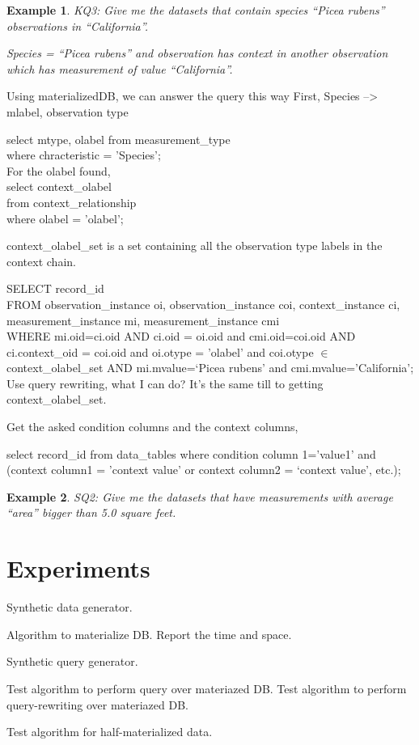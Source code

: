 \documentclass[10pt]{article}
\newtheorem{example}{Example}[section]
\begin{document}
\begin{example}
KQ3: Give me the datasets that contain species ``Picea rubens''
  observations in ``California''. 

Species = ``Picea rubens'' and observation has context {\em in}
another observation which has measurement of value ``California''. 
\end{example}

Using materializedDB, we can answer the query this way
First, Species --> mlabel, observation type 

select mtype, olabel from measurement\_type  \\
where chracteristic = 'Species';  \\

For the olabel found, \\
select context\_olabel\\
from context\_relationship\\
where olabel = 'olabel'; 

context\_olabel\_set is a set containing all the observation type
labels in the context chain. 

SELECT record\_id\\
FROM observation\_instance oi, observation\_instance coi,
context\_instance ci,
measurement\_instance mi, measurement\_instance cmi \\
WHERE mi.oid=ci.oid AND ci.oid = oi.oid and  cmi.oid=coi.oid AND ci.context\_oid =
coi.oid and oi.otype = 'olabel' and coi.otype $\in$
context\_olabel\_set
AND mi.mvalue=`Picea rubens' and cmi.mvalue='California';\\

Use query rewriting, what I can do? 
It's the same till to getting context\_olabel\_set. 

Get the asked condition columns and the context columns, 

select record\_id from data\q_tables
where condition column 1='value1' and (context column1 = 'context
value' or context column2 = `context value', etc.);


\begin{example}
SQ2: Give me the datasets that have measurements with average ``area''
bigger than 5.0 square feet. 
\end{example}


\section{Experiments}

Synthetic data generator. 

Algorithm to materialize DB. 
Report the time and space. 

Synthetic query generator. 

Test algorithm to perform query over materiazed DB.
Test algorithm to perform query-rewriting over materiazed DB.

Test algorithm for half-materialized data.
\end{document}
